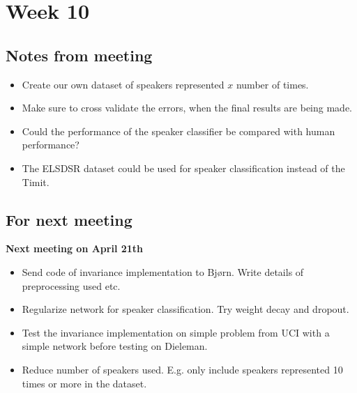 
\section{Week 10}

\subsection{Notes from meeting}

\begin{itemize}
\item Create our own dataset of speakers represented $x$ number of times.
\item Make sure to cross validate the errors, when the final results are being made.
\item Could the performance of the speaker classifier be compared with human
performance?
\item The ELSDSR dataset could be used for speaker classification instead of the Timit.
\end{itemize}

\subsection{For next meeting}

\textbf{Next meeting on April 21th}

\begin{itemize}
\item Send code of invariance implementation to Bjørn. Write details of preprocessing used etc.
\item Regularize network for speaker classification. Try weight decay and dropout.
\item Test the invariance implementation on simple problem from UCI with a simple network before testing on Dieleman.
\item Reduce number of speakers used. E.g. only include speakers represented 10 times or more in the dataset.
\end{itemize}
